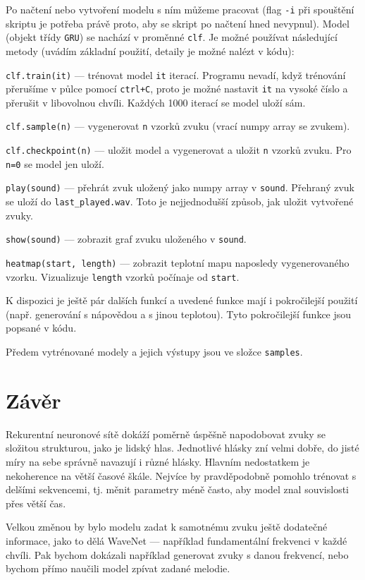 \documentclass[a4]{article}
\begin{document}
Po načtení nebo vytvoření modelu s ním můžeme pracovat (flag \verb|-i| při spouštění skriptu je potřeba právě proto, aby se skript po načtení hned nevypnul). Model (objekt třídy \verb|GRU|) se nachází v proměnné \verb|clf|. Je možné používat následující metody (uvádím základní použití, detaily je možné nalézt v kódu):

\verb|clf.train(it)| --- trénovat model \verb|it| iterací. Programu nevadí, když trénování přerušíme v půlce pomocí \verb|ctrl+C|, proto je možné nastavit \verb|it| na vysoké číslo a přerušit v libovolnou chvíli. Každých 1000 iterací se model uloží sám.

\verb|clf.sample(n)| --- vygenerovat \verb|n| vzorků zvuku (vrací numpy array se zvukem).

\verb|clf.checkpoint(n)| --- uložit model a vygenerovat a uložit \verb|n| vzorků zvuku. Pro \verb|n=0| se model jen uloží.

\verb|play(sound)| --- přehrát zvuk uložený jako numpy array v \verb|sound|. Přehraný zvuk se uloží do \verb|last_played.wav|. Toto je nejjednodušší způsob, jak uložit vytvořené zvuky.

\verb|show(sound)| --- zobrazit graf zvuku uloženého v \verb|sound|.

\verb|heatmap(start, length)| --- zobrazit teplotní mapu naposledy vygenerovaného vzorku. Vizualizuje \verb|length| vzorků počínaje od \verb|start|.

K dispozici je ještě pár dalších funkcí a uvedené funkce mají i pokročilejší použití (např. generování s nápovědou a s jinou teplotou). Tyto pokročilejší funkce jsou popsané v kódu.

Předem vytrénované modely a jejich výstupy jsou ve složce \verb|samples|.

\section{Závěr}
Rekurentní neuronové sítě dokáží poměrně úspěšně napodobovat zvuky se složitou strukturou, jako je lidský hlas. Jednotlivé hlásky zní velmi dobře, do jisté míry na sebe správně navazují i různé hlásky. Hlavním nedostatkem je nekoherence na větší časové škále. Nejvíce by pravděpodobně pomohlo trénovat s delšími sekvencemi, tj. měnit parametry méně často, aby model znal souvislosti přes větší čas.

Velkou změnou by bylo modelu zadat k samotnému zvuku ještě dodatečné informace, jako to dělá WaveNet \cite{wavenet} --- například fundamentální frekvenci v každé chvíli. Pak bychom dokázali například generovat zvuky s danou frekvencí, nebo bychom přímo naučili model zpívat zadané melodie.
\end{document}
